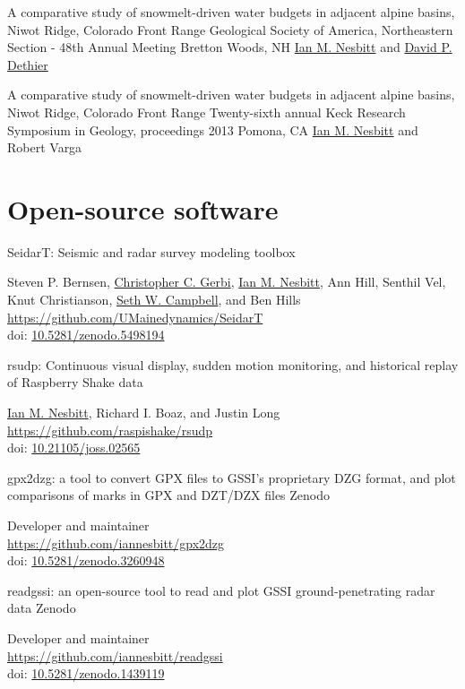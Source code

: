 \documentclass[a4paper,12pt,sans,colorlinks]{moderncv}
\newcommand{\me}{\href{https://www.iannesbitt.org}{Ian M. Nesbitt}}
\newcommand{\seth}{\href{https://www.alpinesciences.net}{Seth W. Campbell}}
\newcommand{\stevebernsen}{Steven P. Bernsen}
\newcommand{\chris}{\href{https://umaine.edu/earthclimate/people/christopher-gerbi/}{Christopher C. Gerbi}}
\newcommand{\richard}{Richard I. Boaz}
\newcommand{\david}{\href{https://geosciences.williams.edu/profile/ddethier/}{David P. Dethier}}
\newcommand{\doi}[1]{%
    \href{https://doi.org/#1}{#1}
}
\begin{document}
{A comparative study of snowmelt-driven water budgets in
adjacent alpine basins, Niwot Ridge, Colorado Front Range}
{Geological Society of America, Northeastern Section - 48th Annual Meeting}
{Bretton Woods, NH}
{}
{
    \me{} and \david{}
}

{A comparative study of snowmelt-driven water budgets in
adjacent alpine basins, Niwot Ridge, Colorado Front Range}
{Twenty-sixth annual Keck Research Symposium in Geology, proceedings 2013}
{Pomona, CA}
{}
{
    \me{} and Robert Varga
}


\section{Open-source software}

{SeidarT: Seismic and radar survey modeling toolbox}
{}
{}
{}
{
    \stevebernsen{}, \chris{}, \me{}, Ann Hill, Senthil Vel,
    Knut Christianson, \seth{}, and Ben Hills
    \\
    \url{https://github.com/UMainedynamics/SeidarT}
    \\
    doi: \doi{10.5281/zenodo.5498194}
}

{rsudp: Continuous visual display, sudden motion monitoring,
and historical replay of Raspberry Shake data}
{}
{}
{}
{
    \me{}, \richard{}, and Justin Long
    \\
    \url{https://github.com/raspishake/rsudp}
    \\
    doi: \doi{10.21105/joss.02565}
}

{gpx2dzg: a tool to convert GPX files to GSSI's proprietary DZG
format, and plot comparisons of marks in GPX and DZT/DZX files}
{Zenodo}
{}
{}
{
    Developer and maintainer
    \\
    \url{https://github.com/iannesbitt/gpx2dzg}
    \\
    doi: \doi{10.5281/zenodo.3260948}
}

{readgssi: an open-source tool to read and plot GSSI
ground-penetrating radar data}
{Zenodo}
{}
{}
{
    Developer and maintainer
    \\
    \url{https://github.com/iannesbitt/readgssi}
    \\
    doi: \doi{10.5281/zenodo.1439119}
}


\end{document}
